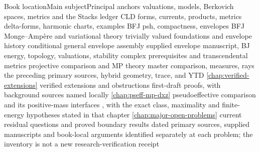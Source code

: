 \begin{AppLProvenanceLedger}{Book location}{Main subject}{Principal anchors}
\AppLProvenanceRecord
  {}
  {valuations, models, Berkovich spaces, metrics}
  {\cite{Berk12,Zhang1995,GM19,CL06} and the Stacks ledger}
\AppLProvenanceRecord
  {}
  {CLD forms, currents, products, metrics}
  {\cite{CLD25}}
\AppLProvenanceRecord
  {}
  {delta-forms, harmonic charts, examples}
  {\cite{GK17,GK19,GJR26,GR25PL,GR25Classical,BGJKK25}}
\AppLProvenanceRecord
  {}
  {BFJ psh, compactness, envelopes}
  {\cite{BFJ16}}
\AppLProvenanceRecord
  {}
  {BFJ Monge--Ampère and variational theory}
  {\cite{BFJ15,BGGJKM20,GJKM19,FGK25}}
\AppLProvenanceRecord
  {}
  {trivially valued foundations and envelope history}
  {\cite{BJ22,BJ22b}}
\AppLProvenanceRecord
  {}
  {conditional general envelope assembly}
  {supplied envelope manuscript,
   \cite{BJ22,BJ22b,deJong1996,RobertsSingh,stacks-project}}
\AppLProvenanceRecord
  {}
  {BJ energy, topology, valuations, stability}
  {\cite{BJ22,BJKS1,BJKS2,BJ25FiniteEnergy}}
\AppLProvenanceRecord
  {}
  {complex prerequisites and transcendental metrics}
  {\cite{XiaBook,BEGZ10,RWN14,DXZ23,Xia23Operations}}
\AppLProvenanceRecord
  {}
  {projective comparison and MP theory}
  {\cite{DXZ23,MP24,MPWN25}}
\AppLProvenanceRecord
  {}
  {master comparison, measures, rays}
  {the preceding primary sources, \cite{BHJ17,BHJ19err}}
\AppLProvenanceRecord
  {}
  {hybrid geometry, trace, and YTD}
  {\cite{BJ17Hybrid,PS23Hybrid,PS22HybridKE,Li25Intermediate,LT26Intermediate,MP24,MPWN25,BBJ21}}
\AppLProvenanceRecord
  {\cref{chap:verified-extensions}}
  {verified extensions and obstructions}
  {first-draft proofs, with background sources named locally}
\AppLProvenanceRecord
  {\cref{chap:pseff-mp-dxz}}
  {pseudoeffective comparison and its positive-mass interfaces}
  {\cite{MP24,DXZ23,XiaBook}, with the exact class, maximality and
   finite-energy hypotheses stated in that chapter}
\AppLProvenanceRecord
  {\cref{chap:major-open-problems}}
  {current residual questions and proved boundary results}
  {dated primary sources, supplied manuscripts and book-local arguments
   identified separately at each problem; the inventory is not a new
   research-verification receipt}
\end{AppLProvenanceLedger}

